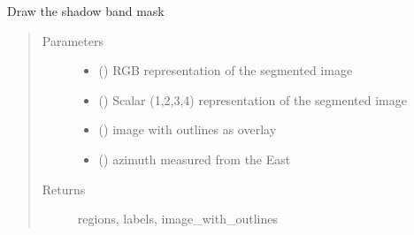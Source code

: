 \documentclass[letterpaper,10pt,english]{sphinxmanual}
\begin{document}
\begin{fulllineitems}
\label{\detokenize{createregions:createregions.draw_band}}
Draw the shadow band mask
\begin{quote}\begin{description}
\item[{Parameters}] \leavevmode\begin{itemize}
\item {} 
 () \textendash{} RGB representation of the segmented image

\item {} 
 () \textendash{} Scalar (1,2,3,4) representation of the segmented image

\item {} 
 () \textendash{} image with outlines as overlay

\item {} 
 () \textendash{} azimuth measured from the East

\end{itemize}

\item[{Returns}] \leavevmode
regions, labels, image\_with\_outlines

\end{description}\end{quote}

\end{fulllineitems}

\end{document}

